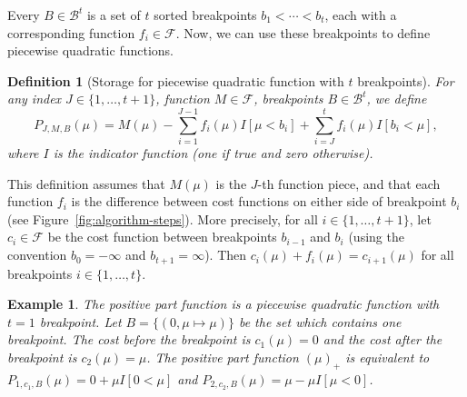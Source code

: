 \documentclass{article}
\newtheorem{theorem}{Theorem}
\newtheorem{definition}{Definition}
\newtheorem{example}{Example}
\begin{document}
\begin{figure*}
  \hskip -0.3cm
  
  \vskip -0.8cm
  \caption{First two steps of the dynamic programming algorithm for
    the data $y_1=4, s_1=1, y_2=1, s_2=-1$ and margin $\epsilon=1$
    using the linear hinge loss $\ell(x)=x$. \textbf{Left:} the
    algorithm begins by creating a first breakpoint at
    $b_{1,1}=y_1-\epsilon=3$, with corresponding function
    $f_{1,1}(\mu)=\mu-3$. The algorithm also stores the cost function
    $m_1(\mu)=\mu-3$ on the interval to the left of the pointer
    $j_1=2$. Note that the cost $c_{1,1}$ before the first breakpoint
    is not yet stored by the algorithm. \textbf{Middle:} the
    optimization step is to move the pointer to the minimum
    ($J_1=j_1-1$), and update the cost function,
    $M_1(\mu)=m_1(\mu) -f_{1,1}(\mu)$.  \textbf{Right:} the algorithm
    adds the second breakpoint at $b_{2,1}=y_2+\epsilon=2$ with
    $f_{2,1}(\mu)=\mu-2$. The cost at the pointer is not affected by
    the new data point, so the pointer does not move.}
  \label{fig:algorithm-steps}
\end{figure*}

Every $B\in\mathcal B^t$ is a set of $t$ sorted breakpoints
$b_1<\cdots<b_t$, each with a corresponding function
$f_i\in\mathcal F$. Now, we can use these breakpoints to define
piecewise quadratic functions.
\begin{definition}[Storage for piecewise quadratic function with $t$ breakpoints]
  For any index $J\in\{1,\dots, t+1\}$, function $M\in\mathcal F$,
  breakpoints $B\in\mathcal B^t$, we define
$$ 
P_{J,M,B}(\mu) = M(\mu)
-\sum_{i=1}^{J-1} f_i(\mu) I[\mu < b_i]
+\sum_{i=J}^t     f_i(\mu) I[b_i < \mu],
$$
where $I$ is the indicator function (one if true and zero otherwise).
\end{definition}
This definition assumes that $M(\mu)$ is the $J$-th function piece,
and that each function $f_i$ is the difference between cost functions
on either side of breakpoint $b_i$ (see
Figure~\ref{fig:algorithm-steps}). More precisely, for all
$i\in\{1,\dots,t+1\}$, let $c_i\in\mathcal F$ be the cost function
between breakpoints $b_{i-1}$ and $b_i$ (using the convention
$b_0=-\infty$ and $b_{t+1}=\infty$). Then
$c_i(\mu)+f_i(\mu)=c_{i+1}(\mu)$ for all breakpoints
$i\in\{1,\dots,t\}$.
\begin{example}
  The positive part function is a piecewise quadratic function with
  $t=1$ breakpoint. Let $B=\{(0,\mu\mapsto\mu)\}$ be the set which
  contains one breakpoint. The cost before the breakpoint is
  $c_1(\mu)=0$ and the cost after the breakpoint is
  $c_2(\mu)=\mu$. The positive part function $(\mu)_+$ is equivalent
  to $P_{1,c_1,B}(\mu)=0+\mu I[0 < \mu]$ and
  $P_{2,c_2,B}(\mu)=\mu - \mu I[\mu < 0]$.
\end{example}
\end{document}
